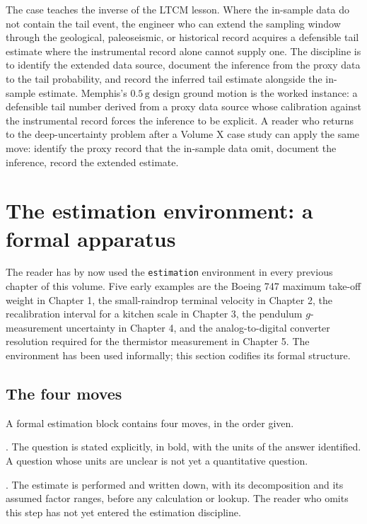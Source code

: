The case teaches the inverse of the LTCM lesson. Where the
in-sample data do not contain the tail event, the engineer
who can extend the sampling window through the geological,
paleoseismic, or historical record acquires a defensible tail
estimate where the instrumental record alone cannot supply
one. The discipline is to identify the extended data source,
document the inference from the proxy data to the tail
probability, and record the inferred tail estimate alongside
the in-sample estimate. Memphis's $0.5 \,\text{g}$ design
ground motion is the worked instance: a defensible tail
number derived from a proxy data source whose calibration
against the instrumental record forces the inference to be
explicit. A reader who returns to the deep-uncertainty
problem after a Volume X case study can apply the same
move: identify the proxy record that the in-sample data
omit, document the inference, record the extended estimate.

\section{The estimation environment: a formal apparatus}

The reader has by now used the \verb|estimation| environment in every
previous chapter of this volume. Five early examples are the Boeing 747
maximum take-off weight in Chapter 1, the small-raindrop terminal
velocity in Chapter 2, the recalibration interval for a kitchen scale
in Chapter 3, the pendulum $g$-measurement uncertainty in Chapter 4,
and the analog-to-digital converter resolution required for the
thermistor measurement in Chapter 5. The environment has been used
informally; this section codifies its formal structure.

\subsection{The four moves}

A formal estimation block contains four moves, in the order given.

. The question is stated explicitly, in
bold, with the units of the answer identified. A question whose
units are unclear is not yet a quantitative question.

. The estimate is performed
and written down, with its decomposition and its assumed factor
ranges, before any calculation or lookup. The reader who omits this
step has not yet entered the estimation discipline.

